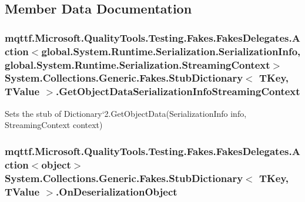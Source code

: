 \subsection{Member Data Documentation}
\hypertarget{class_system_1_1_collections_1_1_generic_1_1_fakes_1_1_stub_dictionary_3_01_t_key_00_01_t_value_01_4_a269083d0904c52178f87d530a5ff2210}{
\subsubsection[{Get\-Object\-Data\-Serialization\-Info\-Streaming\-Context}]{\setlength{\rightskip}{0pt plus 5cm}mqttf.\-Microsoft.\-Quality\-Tools.\-Testing.\-Fakes.\-Fakes\-Delegates.\-Action$<$global.\-System.\-Runtime.\-Serialization.\-Serialization\-Info, global.\-System.\-Runtime.\-Serialization.\-Streaming\-Context$>$ System.\-Collections.\-Generic.\-Fakes.\-Stub\-Dictionary$<$ T\-Key, T\-Value $>$.Get\-Object\-Data\-Serialization\-Info\-Streaming\-Context}}\label{class_system_1_1_collections_1_1_generic_1_1_fakes_1_1_stub_dictionary_3_01_t_key_00_01_t_value_01_4_a269083d0904c52178f87d530a5ff2210}


Sets the stub of Dictionary`2.Get\-Object\-Data(\-Serialization\-Info info, Streaming\-Context context)

\hypertarget{class_system_1_1_collections_1_1_generic_1_1_fakes_1_1_stub_dictionary_3_01_t_key_00_01_t_value_01_4_ae66028322954caf4376bee7d28263532}{
\subsubsection[{On\-Deserialization\-Object}]{\setlength{\rightskip}{0pt plus 5cm}mqttf.\-Microsoft.\-Quality\-Tools.\-Testing.\-Fakes.\-Fakes\-Delegates.\-Action$<$object$>$ System.\-Collections.\-Generic.\-Fakes.\-Stub\-Dictionary$<$ T\-Key, T\-Value $>$.On\-Deserialization\-Object}}\label{class_system_1_1_collections_1_1_generic_1_1_fakes_1_1_stub_dictionary_3_01_t_key_00_01_t_value_01_4_ae66028322954caf4376bee7d28263532}


